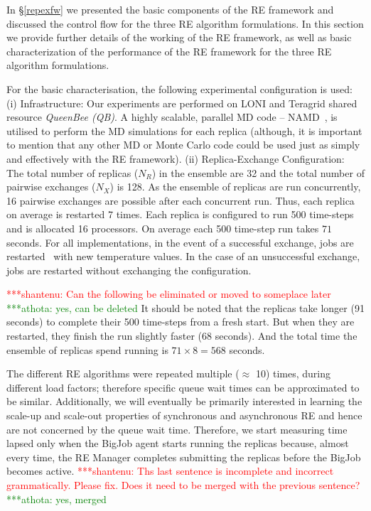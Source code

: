 \documentclass{rspublic}
\newcommand{\jhanote}[1]{ {\textcolor{red} { ***shantenu: #1 }}}
\newcommand{\athotanote}[1]{ {\textcolor{green} { ***athota: #1 }}}
\newcommand{\athotanote}[1]{}
\newcommand{\jhanote}[1]{}
\begin{document}
In \S\ref{repexfw} we presented the basic components of the RE
framework and discussed the control flow for the three RE algorithm
formulations.  In this section we provide further details of the
working of the RE framework, as well as basic characterization of the
performance of the RE framework for the three RE algorithm formulations.


For the basic characterisation, the following experimental
configuration is used: (i) Infrastructure: Our experiments are
performed on LONI and Teragrid shared resource \emph{QueenBee (QB)}. A
highly scalable, parallel MD code -- NAMD~\citep{Phillips:2005gd}, is
utilised to perform the MD simulations for each replica (although, it
is important to mention that any other MD or Monte Carlo code could be
used just as simply and effectively with the RE framework).  (ii)
Replica-Exchange Configuration: The total number of replicas ($N_R$)
in the ensemble are 32 and the total number of pairwise exchanges
($N_X$) is 128. As the ensemble of replicas are run concurrently, 16
pairwise exchanges are possible after each concurrent run. Thus, each
replica on average is restarted 7 times.  Each replica is configured
to run 500 time-steps and is allocated 16 processors.  On average each
500 time-step run takes $71$ seconds.  For all implementations, in the
event of a successful exchange, jobs are
restarted~\citep{Luckow:2008fp} with new temperature values.  In the
case of an unsuccessful exchange, jobs are restarted without
exchanging the configuration.

\jhanote{Can the following be eliminated or moved to someplace later} \athotanote{yes, can be deleted}
It should be noted that the replicas take longer (91 seconds) to
complete their 500 time-steps from a fresh start. But when they are
restarted, they finish the run slightly faster (68 seconds).  And the
total time the ensemble of replicas spend running is $71 \times 8 =
568$ seconds.

The different RE algorithms were repeated multiple ($\approx$ 10)
times, during different load factors; therefore specific queue wait
times can be approximated to be similar.  Additionally, we will
eventually be primarily interested in learning the scale-up and
scale-out properties of synchronous and asynchronous RE and hence are
not concerned by the queue wait time. Therefore, we start measuring
time lapsed only when the BigJob agent starts running the
replicas because, almost every time, the RE Manager
completes submitting the replicas before the BigJob becomes active.
\jhanote{Ths last sentence is incomplete and incorrect
  grammatically. Please fix. Does it need to be merged with the
  previous sentence?} \athotanote{yes, merged}
\end{document}
